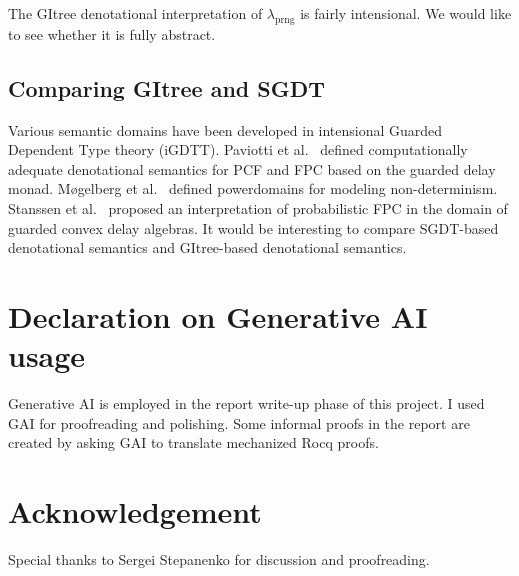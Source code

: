 \documentclass{article}
\theoremstyle{definition}
\theoremstyle{plain}
\theoremstyle{remark}
\newcommand{\prng}{\mathrm{prng}}
\begin{document}
The GItree denotational interpretation of \(\lambda_\prng\) is fairly intensional.
We would like to see whether it is fully abstract.

\subsection{Comparing GItree and SGDT}

Various semantic domains have been developed in intensional Guarded Dependent Type theory (iGDTT).
Paviotti et al.~\cite{paviotti2015model,mogelberg2016denotational} defined computationally adequate denotational semantics for PCF and FPC based on the guarded delay monad.
M{\o}gelberg et al.~\cite{mogelberg2021two} defined powerdomains for modeling non-determinism. Stanssen et al.~\cite{stassen2025modelling} proposed an interpretation of probabilistic FPC in the domain of guarded convex delay algebras.
It would be interesting to compare SGDT-based denotational semantics and GItree-based denotational semantics.

\section{Declaration on Generative AI usage}

Generative AI is employed in the report write-up phase of this project.
I used GAI for proofreading and polishing. Some informal proofs in the report are created by asking GAI to translate mechanized Rocq proofs.

\section{Acknowledgement}

Special thanks to Sergei Stepanenko for discussion and proofreading.

\nocite{*}
\printbibliography
\end{document}
